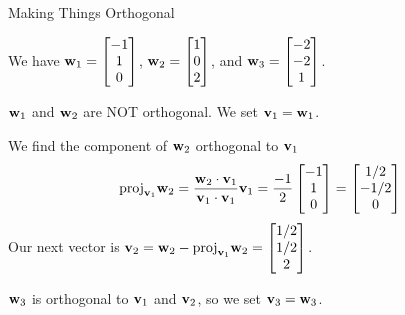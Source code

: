 \documentclass[xcolor=dvipsnames,aspectratio=169,t]{beamer}
\begin{document}
\begin{frame}{Making Things Orthogonal}
  \smallskip
  
  We have $\mathbf{w}_1 = \begin{bmatrix} -1 \\ 1 \\ 0 \end{bmatrix}$, $\mathbf{w}_2 = \begin{bmatrix} 1 \\ 0 \\ 2 \end{bmatrix}$, and $\mathbf{w}_3 =  \begin{bmatrix} -2 \\ -2 \\ 1 \end{bmatrix}$.
  \bigskip

  \bi
  \ii $\mathbf{w}_1$ and $\mathbf{w}_2$ are NOT orthogonal. We set $\mathbf{v}_1 = \mathbf{w}_1$.
  \medskip

  \pause
  \ii We find the component of $\mathbf{w}_2$ orthogonal to $\mathbf{v}_1$
  \[ \mbox{proj}_{\mathbf{v}_1} \mathbf{w}_2 = \frac{\mathbf{w}_2 \cdot \mathbf{v}_1}{\mathbf{v}_1 \cdot \mathbf{v}_1} \mathbf{v}_1 = \frac{-1}{2}  \begin{bmatrix} -1 \\ 1 \\ 0 \end{bmatrix} = \begin{bmatrix} 1/2 \\ -1/2 \\ 0 \end{bmatrix} \]
  Our next vector is $\mathbf{v}_2 = \mathbf{w}_2 - \mbox{proj}_{\mathbf{v}_1} \mathbf{w}_2 = \begin{bmatrix} 1/2 \\ 1/2 \\ 2 \end{bmatrix}$.

  \pause
  \ii $\mathbf{w}_3$ is orthogonal to $\mathbf{v}_1$ and $\mathbf{v}_2$, so we set $\mathbf{v}_3 = \mathbf{w}_3$.
  \ei
\end{frame}
\end{document}
